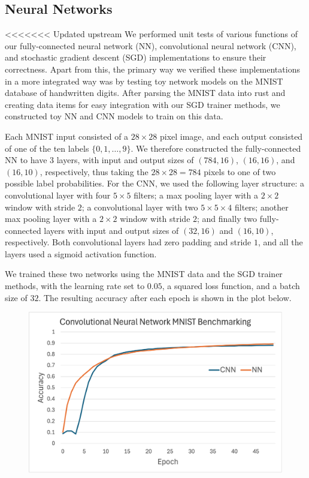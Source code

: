 \subsection{Neural Networks}
<<<<<<< Updated upstream
We performed unit tests of various functions of our fully-connected neural network (NN), convolutional neural network (CNN), and stochastic gradient descent (SGD) implementations to ensure their correctness.
Apart from this, the primary way we verified these implementations in a more integrated way was by testing toy network models on the MNIST database of handwritten digits\textcolor{blue}{\autocite{MNIST_Dataset}}.
After parsing the MNIST data into rust and creating data items for easy integration with our SGD trainer methods, we constructed toy NN and CNN models to train on this data.

Each MNIST input consisted of a $28 \times 28$ pixel image, and each output consisted of one of the ten labels $\{0, 1, \dots, 9\}$.
We therefore constructed the fully-connected NN to have 3 layers, with input and output sizes of $(784, 16)$, $(16, 16)$, and $(16, 10)$, respectively, thus taking the $28 \times 28 = 784$ pixels to one of two possible label probabilities.
For the CNN, we used the following layer structure: a convolutional layer with four $5 \times 5$ filters; a max pooling layer with a $2 \times 2$ window with stride $2$; a convolutional layer with two $5 \times 5 \times 4$ filters; another max pooling layer with a $2 \times 2$ window with stride $2$; and finally two fully-connected layers with input and output sizes of $(32, 16)$ and $(16, 10)$, respectively. Both convolutional layers had zero padding and stride $1$, and all the layers used a sigmoid activation function.

We trained these two networks using the MNIST data and the SGD trainer methods, with the learning rate set to $0.05$, a squared loss function, and a batch size of $32$.
The resulting accuracy after each epoch is shown in the plot below.

\begin{figure}[H]
  \includegraphics[width=\textwidth]{images/CNNBenchmarking.png}
\end{figure}

